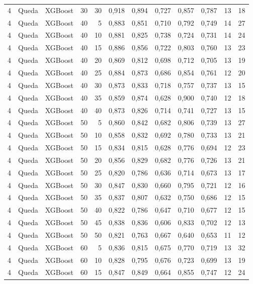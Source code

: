 \begin{longtable}{ccclrrrrrrrr}
4 & Queda & XGBoost & 30 & 30 & 0,918 & 0,894 & 0,727 & 0,857 & 0,787 & 13 & 18 \\
4 & Queda & XGBoost & 40 & 5 & 0,883 & 0,851 & 0,710 & 0,792 & 0,749 & 14 & 27 \\
4 & Queda & XGBoost & 40 & 10 & 0,881 & 0,825 & 0,738 & 0,724 & 0,731 & 14 & 24 \\
4 & Queda & XGBoost & 40 & 15 & 0,886 & 0,856 & 0,722 & 0,803 & 0,760 & 13 & 23 \\
4 & Queda & XGBoost & 40 & 20 & 0,869 & 0,812 & 0,698 & 0,712 & 0,705 & 13 & 19 \\
4 & Queda & XGBoost & 40 & 25 & 0,884 & 0,873 & 0,686 & 0,854 & 0,761 & 12 & 20 \\
4 & Queda & XGBoost & 40 & 30 & 0,873 & 0,833 & 0,718 & 0,757 & 0,737 & 13 & 15 \\
4 & Queda & XGBoost & 40 & 35 & 0,859 & 0,874 & 0,628 & 0,900 & 0,740 & 12 & 18 \\
4 & Queda & XGBoost & 40 & 40 & 0,873 & 0,826 & 0,714 & 0,741 & 0,727 & 13 & 15 \\
4 & Queda & XGBoost & 50 & 5 & 0,860 & 0,842 & 0,682 & 0,806 & 0,739 & 13 & 27 \\
4 & Queda & XGBoost & 50 & 10 & 0,858 & 0,832 & 0,692 & 0,780 & 0,733 & 13 & 21 \\
4 & Queda & XGBoost & 50 & 15 & 0,834 & 0,815 & 0,628 & 0,776 & 0,694 & 12 & 23 \\
4 & Queda & XGBoost & 50 & 20 & 0,856 & 0,829 & 0,682 & 0,776 & 0,726 & 13 & 21 \\
4 & Queda & XGBoost & 50 & 25 & 0,820 & 0,786 & 0,636 & 0,714 & 0,673 & 13 & 17 \\
4 & Queda & XGBoost & 50 & 30 & 0,847 & 0,830 & 0,660 & 0,795 & 0,721 & 12 & 16 \\
4 & Queda & XGBoost & 50 & 35 & 0,837 & 0,807 & 0,632 & 0,750 & 0,686 & 12 & 15 \\
4 & Queda & XGBoost & 50 & 40 & 0,822 & 0,786 & 0,647 & 0,710 & 0,677 & 12 & 15 \\
4 & Queda & XGBoost & 50 & 45 & 0,838 & 0,836 & 0,606 & 0,833 & 0,702 & 12 & 13 \\
4 & Queda & XGBoost & 50 & 50 & 0,821 & 0,763 & 0,667 & 0,640 & 0,653 & 11 & 12 \\
4 & Queda & XGBoost & 60 & 5 & 0,836 & 0,815 & 0,675 & 0,770 & 0,719 & 13 & 32 \\
4 & Queda & XGBoost & 60 & 10 & 0,828 & 0,795 & 0,676 & 0,723 & 0,699 & 13 & 19 \\
4 & Queda & XGBoost & 60 & 15 & 0,847 & 0,849 & 0,664 & 0,855 & 0,747 & 12 & 24 \\

\end{longtable}
